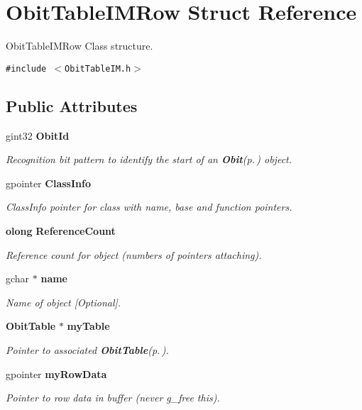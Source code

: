 \section{Obit\-Table\-IMRow Struct Reference}
\label{structObitTableIMRow}
Obit\-Table\-IMRow Class structure.  


{\tt \#include $<$Obit\-Table\-IM.h$>$}

\subsection*{Public Attributes}
\begin{CompactItemize}
\item 
gint32 {\bf Obit\-Id}
\begin{CompactList}\small\item\em Recognition bit pattern to identify the start of an {\bf Obit}{\rm (p.\,\pageref{structObit})} object. \item\end{CompactList}\item 
gpointer {\bf Class\-Info}
\begin{CompactList}\small\item\em Class\-Info pointer for class with name, base and function pointers. \item\end{CompactList}\item 
{\bf olong} {\bf Reference\-Count}
\begin{CompactList}\small\item\em Reference count for object (numbers of pointers attaching). \item\end{CompactList}\item 
gchar $\ast$ {\bf name}
\begin{CompactList}\small\item\em Name of object [Optional]. \item\end{CompactList}\item 
{\bf Obit\-Table} $\ast$ {\bf my\-Table}
\begin{CompactList}\small\item\em Pointer to associated {\bf Obit\-Table}{\rm (p.\,\pageref{structObitTable})}. \item\end{CompactList}\item 
gpointer {\bf my\-Row\-Data}
\begin{CompactList}\small\item\em Pointer to row data in buffer (never g\_\-free this). \item\end{CompactList}\item 

\end{CompactItemize}
